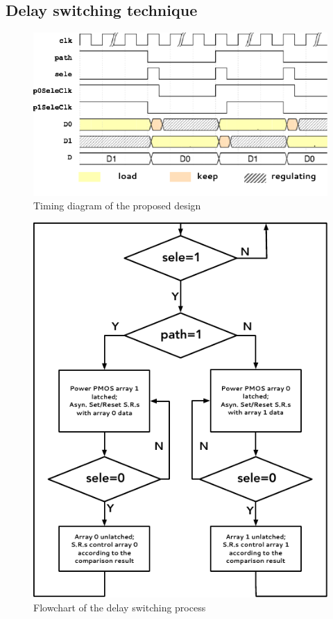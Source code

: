 \documentclass[draftcls, journal]{IEEEtran}
\begin{document}
\subsection{Delay switching technique}
\begin{figure}[t!]
    \centering
    \includegraphics[width=\linewidth]{pic/struc/timing.pdf}
    \caption{Timing diagram of the proposed design}
    \label{fig:timing}
\end{figure}
\begin{figure}[t!]
    \centering
    \includegraphics[width=0.9\linewidth]{pic/struc/flowChart.pdf}
    \caption{Flowchart of the delay switching process}
    \label{fig:flowchart}
\end{figure}
\end{document}
